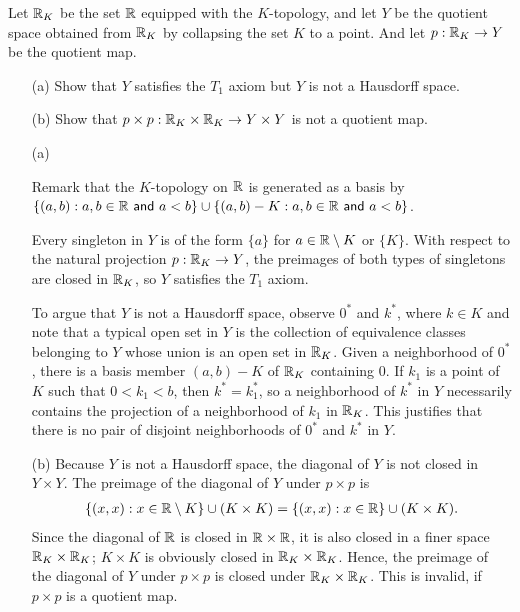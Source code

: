 \begin{prob}\label{the product of quotient maps need not be a quotient map}
    Let ${\mathbb{R}}_K$ be the set ${\mathbb{R}}$ equipped with the $K$-topology, and let $Y$ be the quotient space obtained from ${\mathbb{R}}_K$ by collapsing the set $K$ to a point.
    And let $p: {\mathbb{R}}_K\rightarrow Y$ be the quotient map.
    \begin{enumerate}
        \item[(a)]
        {
            Show that $Y$ satisfies the $T_1$ axiom but $Y$ is not a Hausdorff space.
        }
        \item[(b)]
        {
            Show that $p\times p: {\mathbb{R}}_K\times{\mathbb{R}}_K\rightarrow Y\times Y$ is not a quotient map.
        }
    \end{enumerate}
\end{prob}
\begin{sol}
    \begin{enumerate}
        \item[(a)]
        {
            Remark that the $K$-topology on ${\mathbb{R}}$ is generated as a basis by $\{(a, b): \textsf{$a, b\in{\mathbb{R}}$ and $a<b$}\}\cup\{(a, b)-K: \textsf{$a, b\in{\mathbb{R}}$ and $a<b$}\}$.

            Every singleton in $Y$ is of the form $\{a\}$ for $a\in{\mathbb{R}}\setminus K$ or $\{K\}$.
            With respect to the natural projection $p: {\mathbb{R}}_K\rightarrow Y$, the preimages of both types of singletons are closed in ${\mathbb{R}}_K$, so $Y$ satisfies the $T_1$ axiom.

            To argue that $Y$ is not a Hausdorff space, observe $0^*$ and $k^*$, where $k\in K$ and note that a typical open set in $Y$ is the collection of equivalence classes belonging to $Y$ whose union is an open set in ${\mathbb{R}}_K$.
            Given a neighborhood of $0^*$, there is a basis member $(a, b)-K$ of ${\mathbb{R}}_K$ containing $0$.
            If $k_1$ is a point of $K$ such that $0<k_1<b$, then $k^*=k_1^*$, so a neighborhood of $k^*$ in $Y$ necessarily contains the projection of a neighborhood of $k_1$ in ${\mathbb{R}}_K$.
            This justifies that there is no pair of disjoint neighborhoods of $0^*$ and $k^*$ in $Y$.
        }
        \item[(b)]
        {
            Because $Y$ is not a Hausdorff space, the diagonal of $Y$ is not closed in $Y\times Y$.
            The preimage of the diagonal of $Y$ under $p\times p$ is
            \begin{align*}
                \{(x, x): x\in{\mathbb{R}}\setminus K\}\cup (K\times K)=\{(x, x): x\in{\mathbb{R}}\}\cup (K\times K).
            \end{align*}
            Since the diagonal of ${\mathbb{R}}$ is closed in ${\mathbb{R}}\times{\mathbb{R}}$, it is also closed in a finer space ${\mathbb{R}}_K\times{\mathbb{R}}_K$; $K\times K$ is obviously closed in ${\mathbb{R}}_K\times{\mathbb{R}}_K$.
            Hence, the preimage of the diagonal of $Y$ under $p\times p$ is closed under ${\mathbb{R}}_K\times{\mathbb{R}}_K$.
            This is invalid, if $p\times p$ is a quotient map.
        }
    \end{enumerate}
\end{sol}